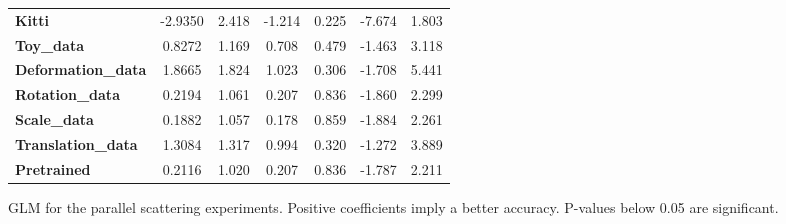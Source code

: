 \begin{figure}[!htb]
\begin{center}
\begin{tabular}{lcccccc}
			\textbf{Kitti}             &      -2.9350  &        2.418     &    -1.214  &         0.225        &       -7.674    &        1.803     \\
			\textbf{Toy\_data}         &       0.8272  &        1.169     &     0.708  &         0.479        &       -1.463    &        3.118     \\
			\textbf{Deformation\_data} &       1.8665  &        1.824     &     1.023  &         0.306        &       -1.708    &        5.441     \\
			\textbf{Rotation\_data}    &       0.2194  &        1.061     &     0.207  &         0.836        &       -1.860    &        2.299     \\
			\textbf{Scale\_data}       &       0.1882  &        1.057     &     0.178  &         0.859        &       -1.884    &        2.261     \\
			\textbf{Translation\_data} &       1.3084  &        1.317     &     0.994  &         0.320        &       -1.272    &        3.889     \\
			\textbf{Pretrained}        &       0.2116  &        1.020     &     0.207  &         0.836        &       -1.787    &        2.211     \\
			\bottomrule
		\end{tabular}
	\end{center}
\caption{GLM for the parallel scattering experiments. Positive coefficients imply a better accuracy. P-values below 0.05 are significant.}
\label{fig:GLM_parallel_scattering}
\end{figure}

